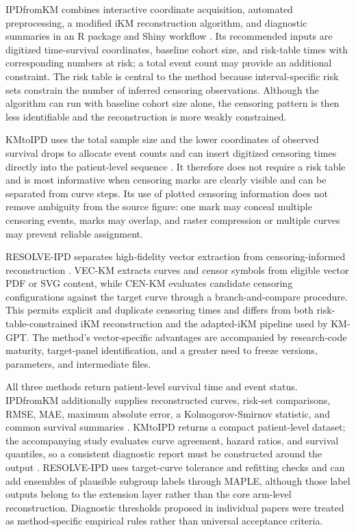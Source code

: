 \documentclass[10pt,letterpaper]{article}
\begin{document}
IPDfromKM combines interactive coordinate acquisition, automated preprocessing, a modified iKM reconstruction algorithm, and diagnostic summaries in an R package and Shiny workflow \cite{liu2021}. Its recommended inputs are digitized time-survival coordinates, baseline cohort size, and risk-table times with corresponding numbers at risk; a total event count may provide an additional constraint. The risk table is central to the method because interval-specific risk sets constrain the number of inferred censoring observations. Although the algorithm can run with baseline cohort size alone, the censoring pattern is then less identifiable and the reconstruction is more weakly constrained.

KMtoIPD uses the total sample size and the lower coordinates of observed survival drops to allocate event counts and can insert digitized censoring times directly into the patient-level sequence \cite{rogula2022}. It therefore does not require a risk table and is most informative when censoring marks are clearly visible and can be separated from curve steps. Its use of plotted censoring information does not remove ambiguity from the source figure: one mark may conceal multiple censoring events, marks may overlap, and raster compression or multiple curves may prevent reliable assignment.

RESOLVE-IPD separates high-fidelity vector extraction from censoring-informed reconstruction \cite{resolve2026}. VEC-KM extracts curves and censor symbols from eligible vector PDF or SVG content, while CEN-KM evaluates candidate censoring configurations against the target curve through a branch-and-compare procedure. This permits explicit and duplicate censoring times and differs from both risk-table-constrained iKM reconstruction and the adapted-iKM pipeline used by KM-GPT. The method's vector-specific advantages are accompanied by research-code maturity, target-panel identification, and a greater need to freeze versions, parameters, and intermediate files.

All three methods return patient-level survival time and event status. IPDfromKM additionally supplies reconstructed curves, risk-set comparisons, RMSE, MAE, maximum absolute error, a Kolmogorov-Smirnov statistic, and common survival summaries \cite{liu2021}. KMtoIPD returns a compact patient-level dataset; the accompanying study evaluates curve agreement, hazard ratios, and survival quantiles, so a consistent diagnostic report must be constructed around the output \cite{rogula2022}. RESOLVE-IPD uses target-curve tolerance and refitting checks and can add ensembles of plausible subgroup labels through MAPLE, although those label outputs belong to the extension layer rather than the core arm-level reconstruction. Diagnostic thresholds proposed in individual papers were treated as method-specific empirical rules rather than universal acceptance criteria.
\end{document}
